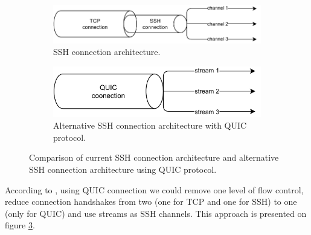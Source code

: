 \begin{figure}[h]
  \begin{subfigure}[b]{0.4\textwidth}
    \includegraphics[width=\textwidth]{img/__06__current_standards_and_protocols/ssh.pdf}
    \caption{SSH connection architecture.}
    \label{fig:ssh-connection}
  \end{subfigure}
  \hfill
  \begin{subfigure}[b]{0.4\textwidth}
    \includegraphics[width=\textwidth]{img/__06__current_standards_and_protocols/quic_ssh.pdf}
    \caption{Alternative SSH connection architecture with QUIC protocol.}
    \label{fig:quic-ssh-connection}
  \end{subfigure}
  \caption{Comparison of current SSH connection architecture and alternative SSH connection architecture using QUIC protocol.}
\end{figure}

According to \cite{bider-ssh-quic-09}, using QUIC connection we could remove one level of flow control, reduce connection handshakes from two (one for TCP and one for SSH) to one (only for QUIC) and use streams as SSH channels.
This approach is presented on figure \ref{fig:quic-ssh-connection}.
